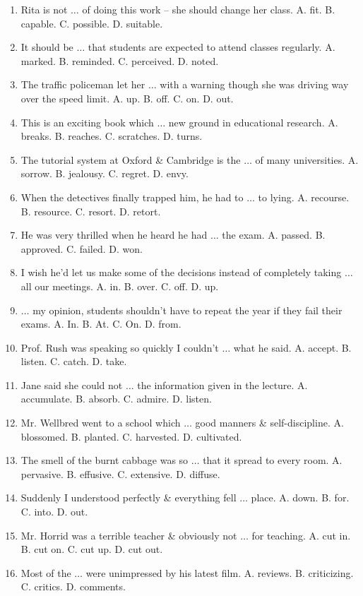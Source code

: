 \documentclass{article}
\numberwithin{equation}{section}
\begin{document}
\begin{enumerate}[leftmargin=5mm]
	\item Rita is not $\ldots$ of doing this work -- she should change her class. A. fit. B. capable. C. possible. D. suitable.
	\item It should be $\ldots$ that students are expected to attend classes regularly. A. marked. B. reminded. C. perceived. D. noted.
	\item The traffic policeman let her $\ldots$ with a warning though she was driving way over the speed limit. A. up. B. off. C. on. D. out.
	\item This is an exciting book which $\ldots$ new ground in educational research. A. breaks. B. reaches. C. scratches. D. turns.
	\item The tutorial system at Oxford \& Cambridge is the $\ldots$ of many universities. A. sorrow. B. jealousy. C. regret. D. envy.
	\item When the detectives finally trapped him, he had to $\ldots$ to lying. A. recourse. B. resource. C. resort. D. retort.
	\item He was very thrilled when he heard he had $\ldots$ the exam. A. passed. B. approved. C. failed. D. won.
	\item I wish he'd let us make some of the decisions instead of completely taking $\ldots$ all our meetings. A. in. B. over. C. off. D. up.
	\item $\ldots$ my opinion, students shouldn't have to repeat the year if they fail their exams. A. In. B. At. C. On. D. from.
	\item Prof. Rush was speaking so quickly I couldn't $\ldots$ what he said. A. accept. B. listen. C. catch. D. take.
	\item Jane said she could not $\ldots$ the information given in the lecture. A. accumulate. B. absorb. C. admire. D. listen.
	\item Mr. Wellbred went to a school which $\ldots$ good manners \& self-discipline. A. blossomed. B. planted. C. harvested. D. cultivated.
	\item The smell of the burnt cabbage was so $\ldots$ that it spread to every room. A. pervasive. B. effusive. C. extensive. D. diffuse.
	\item Suddenly I understood perfectly \& everything fell $\ldots$ place. A. down. B. for. C. into. D. out.
	\item Mr. Horrid was a terrible teacher \& obviously not $\ldots$ for teaching. A. cut in. B. cut on. C. cut up. D. cut out.
	\item Most of the $\ldots$ were unimpressed by his latest film. A. reviews. B. criticizing. C. critics. D. comments.

\end{enumerate}
\end{document}
